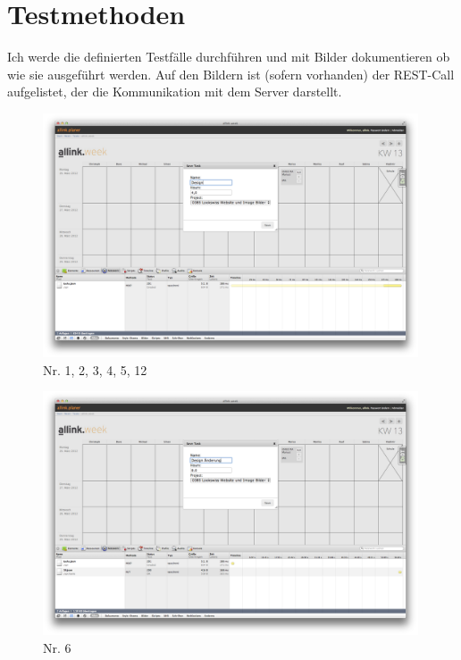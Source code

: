 \section{Testmethoden}
Ich werde die definierten Testfälle durchführen und mit Bilder dokumentieren ob wie sie ausgeführt werden.
Auf den Bildern ist (sofern vorhanden) der REST-Call aufgelistet, der die Kommunikation mit dem Server darstellt.
\clearpage
\begin{figure}[htbp]
    \centering
        \includegraphics[width=0.99\textwidth,angle=0]{bilder/testing/Task_erstellen.png}
    \caption{Nr. 1, 2, 3, 4, 5, 12}
    \label{fig:bilder_testing_Task erstellen}
\end{figure}
\begin{figure}[htbp]
    \centering
        \includegraphics[width=0.99\textwidth,angle=0]{bilder/testing/Task_bearbeiten.png}
    \caption{Nr. 6}
    \label{fig:bilder_testing_Task_bearbeiten}
\end{figure}
